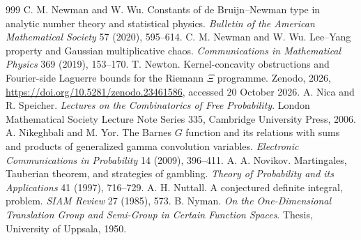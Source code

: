 \begin{thebibliography}{999}
 C. M. Newman and W. Wu. Constants of de Bruijn--Newman type in analytic number theory and statistical physics. \emph{Bulletin of the American Mathematical Society} 57 (2020), 595--614.
 C. M. Newman and W. Wu. Lee--Yang property and Gaussian multiplicative chaos. \emph{Communications in Mathematical Physics} 369 (2019), 153--170.
 T. Newton. Kernel-concavity obstructions and Fourier-side Laguerre bounds for the Riemann $\Xi$ programme. Zenodo, 2026, \url{https://doi.org/10.5281/zenodo.23461586}, accessed 20 October 2026.
 A. Nica and R. Speicher. \emph{Lectures on the Combinatorics of Free Probability}. London Mathematical Society Lecture Note Series 335, Cambridge University Press, 2006.
 A. Nikeghbali and M. Yor. The Barnes $G$ function and its relations with sums and products of generalized gamma convolution variables. \emph{Electronic Communications in Probability} 14 (2009), 396--411.
 A. A. Novikov. Martingales, Tauberian theorem, and strategies of gambling. \emph{Theory of Probability and its Applications} 41 (1997), 716--729.
 A. H. Nuttall. A conjectured definite integral, problem. \emph{SIAM Review} 27 (1985), 573.
 B. Nyman. \emph{On the One-Dimensional Translation Group and Semi-Group in Certain Function Spaces}. Thesis, University of Uppsala, 1950.

\end{thebibliography}
